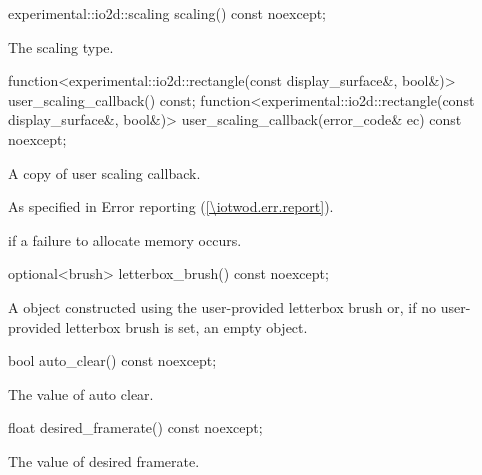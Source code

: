 \begin{itemdecl}
experimental::io2d::scaling scaling() const noexcept;
\end{itemdecl}
\begin{itemdescr}
\pnum
\returns
The scaling type.
\end{itemdescr}

\begin{itemdecl}
function<experimental::io2d::rectangle(const display_surface&, bool&)>
  user_scaling_callback() const;
function<experimental::io2d::rectangle(const display_surface&, bool&)>
  user_scaling_callback(error_code& ec) const noexcept;
\end{itemdecl}
\begin{itemdescr}
\pnum
\returns
A copy of user scaling callback.

\pnum
\throws
As specified in Error reporting (\ref{\iotwod.err.report}).

\pnum
\errors
{} if a failure to allocate memory occurs.
\end{itemdescr}

\begin{itemdecl}
optional<brush> letterbox_brush() const noexcept;
\end{itemdecl}
\begin{itemdescr}
\pnum
\returns
A  object constructed using the user-provided letterbox brush or, if no user-provided letterbox brush is set, an empty  object.
\end{itemdescr}

\begin{itemdecl}
bool auto_clear() const noexcept;
\end{itemdecl}
\begin{itemdescr}
\pnum
\returns
The value of auto clear.
\end{itemdescr}

\begin{itemdecl}
float desired_framerate() const noexcept;
\end{itemdecl}
\begin{itemdescr}
\pnum
\returns
The value of desired framerate.
\end{itemdescr}


